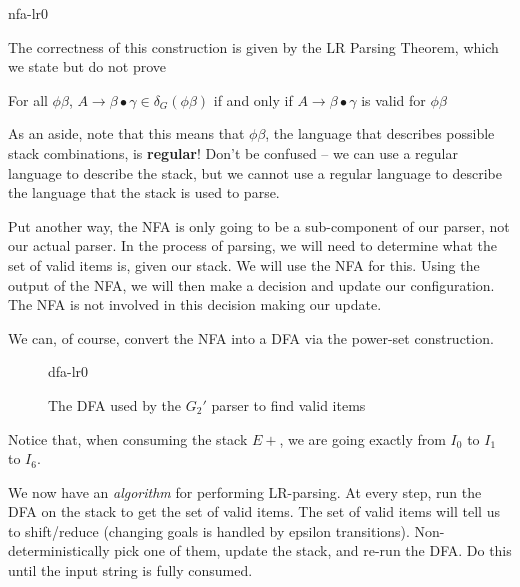 \begin{center}
    {nfa-lr0}
\end{center}

The correctness of this construction is given by the LR Parsing Theorem, which we state but do not prove

\begin{theorem}
    For all $\phi\beta$, $A \to \beta\bullet\gamma \in \delta_G(\phi\beta)$ if and only if $A \to \beta\bullet\gamma$ is valid for $\phi\beta$ 
\end{theorem}

As an aside, note that this means that $\phi\beta$, the language that describes possible stack combinations, is \textbf{regular}! Don't be confused -- we can use a regular language to describe the stack, but we cannot use a regular language to describe the language that the stack is used to parse. 

Put another way, the NFA is only going to be a sub-component of our parser, not our actual parser. In the process of parsing, we will need to determine what the set of valid items is, given our stack. We will use the NFA for this. Using the output of the NFA, we will then make a decision and update our configuration. The NFA is not involved in this decision making our update. 

We can, of course, convert the NFA into a DFA via the power-set construction. 

\begin{figure}[H]
    \centering
    {dfa-lr0}
    \caption{The DFA used by the $G_2'$ parser to find valid items}
    \label{fig:dfa-lr0}
\end{figure}

Notice that, when consuming the stack $E+$, we are going exactly from $I_0$ to $I_1$ to $I_6$.

We now have an \textit{algorithm} for performing LR-parsing. At every step, run the DFA on the stack to get the set of valid items. The set of valid items will tell us to shift/reduce (changing goals is handled by epsilon transitions). Non-deterministically pick one of them, update the stack, and re-run the DFA. Do this until the input string is fully consumed. 

